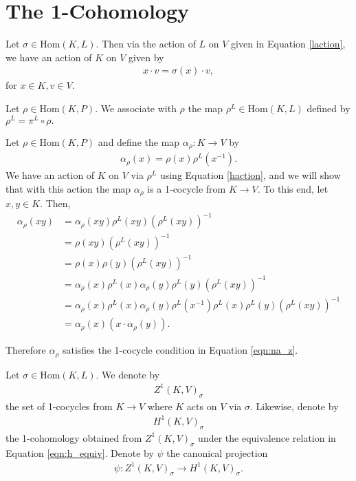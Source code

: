 \section{The 1-Cohomology}
Let $\sigma \in \mathrm{Hom}(K, L)$. Then via the action of $L$ on $V$ given in Equation \ref{laction}, we have an action of $K$ on $V$ given by
\begin{align} \label{haction} x \cdot v = \sigma(x) \cdot v, \end{align}
for $x \in K, v \in V$.

\begin{definition} Let $\rho \in \mathrm{Hom}(K, P)$. We associate with $\rho$ the map $\rho^L \in \mathrm{Hom}(K, L)$ defined by
$\rho^L = \pi^L \circ \rho.$
\end{definition}

Let $\rho \in \mathrm{Hom}(K, P)$ and define the map $\alpha_\rho: K \rightarrow V$ by
\begin{align}\label{rho:alpha}
\alpha_\rho(x) = \rho(x)\rho^L(x^{-1}).
\end{align}
We have an action of $K$ on $V$ via $\rho^L$ using Equation \ref{haction}, and we will show that with this action the map $\alpha_\rho$ is a 1-cocycle from $K \rightarrow V$. To this end, let $x, y \in K$.
Then,
\begin{align*} \alpha_\rho(xy) &= \alpha_\rho(xy) \rho^L(xy) \left(\rho^L(xy)\right)^{-1} \\
	&= \rho(xy) \left(\rho^L(xy)\right)^{-1} \\
	&= \rho(x) \rho(y) \left(\rho^L(xy)\right)^{-1} \\
	&= \alpha_\rho(x) \rho^L(x) \alpha_\rho(y) \rho^L(y) \left(\rho^L(xy)\right)^{-1} \\
	&= \alpha_\rho(x) \rho^L(x) \alpha_\rho(y) \rho^L(x^{-1}) \rho^L(x) \rho^L(y) \left(\rho^L(xy)\right)^{-1} \\
	&= \alpha_\rho(x) \left(x \cdot \alpha_\rho(y)\right). 
\end{align*}

Therefore $\alpha_\rho$ satisfies the 1-cocycle condition in Equation \ref{eqn:na_z}.

\begin{definition}\label{h1sigma} Let $\sigma \in \mathrm{Hom}(K, L)$. We denote by
\begin{align*} Z^1(K, V)_\sigma \end{align*}
the set of 1-cocycles from $K \rightarrow V$ where $K$ acts on $V$ via $\sigma$.
Likewise, denote by
\begin{align*} H^1(K, V)_\sigma \end{align*}
the 1-cohomology obtained from $Z^1(K, V)_\sigma$ under the equivalence relation in Equation \ref{eqn:h_equiv}. Denote by $\psi$ the canonical projection
\begin{align*} \psi : Z^1(K, V)_\sigma \rightarrow H^1(K, V)_\sigma. \end{align*}
\end{definition} 


